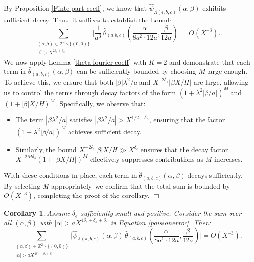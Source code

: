 \documentclass{article}
\newtheorem{cor}[theorem]{Corollary}
\newenvironment{proof}{\noindent {\bf Proof:}}{$\Box$ \vspace{2 ex}}
\begin{document}
\begin{proof}
By Proposition \ref{Finte-part-coeff}, we know that $\widehat{\psi}_{\Lambda(a, b, c)}(\alpha, \beta)$ exhibits sufficient decay. Thus, it suffices to establish the bound:
\begin{equation*}
    \sum_{\substack{(\alpha, \beta) \in \mathbb{Z}^2 \backslash \{(0, 0)\} \\ |\beta| > X^{2\delta_s + \delta_e}}} \Big| \frac{1}{a^3} \, \widehat{\theta}_{(a, b, c)}\left(\frac{\alpha}{8a^2 \cdot 12a}, \frac{\beta}{12a}\right) \Big| = O(X^{-3}).
\end{equation*}
We now apply Lemma \ref{theta-fourier-coeff} with $K = 2$ and demonstrate that each term in $\widehat{\theta}_{(a, b, c)}(\alpha, \beta)$ can be sufficiently bounded by choosing $M$ large enough. To achieve this, we ensure that both $|\beta| \lambda^2 / a$ and $X^{-2\delta_s} |\beta X / H|$ are large, allowing us to control the terms through decay factors of the form $(1 + \lambda^2 |\beta/a|)^M$ and $(1 + |\beta| X / H)^M$. Specifically, we observe that:
\begin{itemize}
    \item The term $|\beta \lambda^2 / a|$ satisfies $|\beta \lambda^2 / a| > X^{1/2 - \delta_a}$, ensuring that the factor $(1 + \lambda^2 |\beta/a|)^M$ achieves sufficient decay.
    \item Similarly, the bound $X^{-2\delta_s} |\beta| X / H \gg X^{\delta_e}$ ensures that the decay factor $X^{-2M\delta_s}(1 + |\beta X / H|)^M$ effectively suppresses contributions as $M$ increases.
\end{itemize}
With these conditions in place, each term in $\widehat{\theta}_{(a, b, c)}(\alpha, \beta)$ decays sufficiently. By selecting $M$ appropriately, we confirm that the total sum is bounded by $O(X^{-3})$, completing the proof of the corollary.
\end{proof}
\begin{cor}\label{alpha}
Assume $\delta_e$ sufficiently small and positive. Consider the sum over all $(\alpha, \beta)$ with $|\alpha| > aX^{4\delta_s + \delta_a+\delta_e}$ in Equation \eqref{poissonerror}. Then:
\begin{equation*}
      \sum_{\substack{(\alpha, \beta) \in \mathbb{Z}^2 \backslash \{(0, 0)\} \\ |\alpha| > a X^{4\delta_s + \delta_a + \delta_e}}} 
    \Big| \widehat{\psi}_{\Lambda(a, b, c)}(\alpha, \beta) \, \widehat{\theta}_{(a, b, c)}\left(\frac{\alpha}{8a^2 \cdot 12a}, \frac{\beta}{12a}\right) \Big|= O(X^{-3}).
\end{equation*}
\end{cor}
\end{document}
